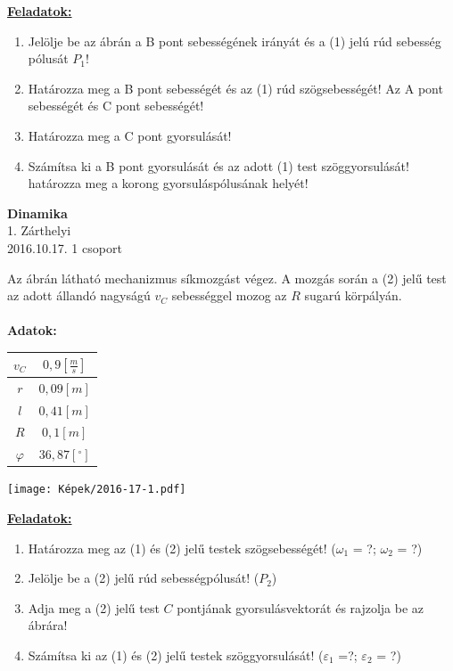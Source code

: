 \documentclass[11pt,a4paper]{article}
\begin{document}
\underline{\textbf{Feladatok:}}
\begin{enumerate}
    \item Jelölje be az ábrán a B pont sebességének irányát és a (1) jelú rúd sebesség pólusát \(P_1\)!
    \item Határozza meg a B pont sebességét és az (1) rúd szögsebességét! Az A pont sebességét és C pont sebességét!
    \item Határozza meg a C pont gyorsulását!
    \item Számítsa ki a B pont gyorsulását és az adott (1) test szöggyorsulását! határozza meg a korong gyorsuláspólusának helyét!
\end{enumerate}
\newpage

\begin{center}
    \textbf{\LARGE{Dinamika}}\\
    1. Zárthelyi\\
    2016.10.17. 1 csoport
\end{center}
Az ábrán látható mechanizmus síkmozgást végez. A mozgás során a (2) jelű test az adott állandó nagyságú $v_C$ sebességgel mozog az $R$ sugarú körpályán.\\\\
\textbf{Adatok:}\\
\begin{tabular}{| c | c |}
    \hline
    $v_C $&$ 0,9 \left[\frac{m}{s}\right]$\\
    \hline
    $r $&$ 0,09 [m]$\\
    \hline
    $l $&$ 0,41 [m]$\\
    \hline
    $R $&$ 0,1 [m]$\\
    \hline
    $\varphi $&$ 36,87 [^\circ]$\\
    \hline
\end{tabular}
\begin{center}
    \texttt{[image: Képek/2016-17-1.pdf]}
\end{center}

\underline{\textbf{Feladatok:}}
\begin{enumerate}
    \item Határozza meg az (1) és (2) jelű testek szögsebességét! ($\omega_1$ = ?; $\omega_2$ = ?)
    \item Jelölje be a (2) jelű rúd sebességpólusát! ($P_2$)
    \item Adja meg a (2) jelű test $C$ pontjának gyorsulásvektorát és rajzolja be az ábrára!
    \item Számítsa ki az (1) és (2) jelű testek szöggyorsulását! ($\varepsilon_1$ =?; $\varepsilon_2$ = ?)
\end{enumerate}
\newpage
\end{document}
